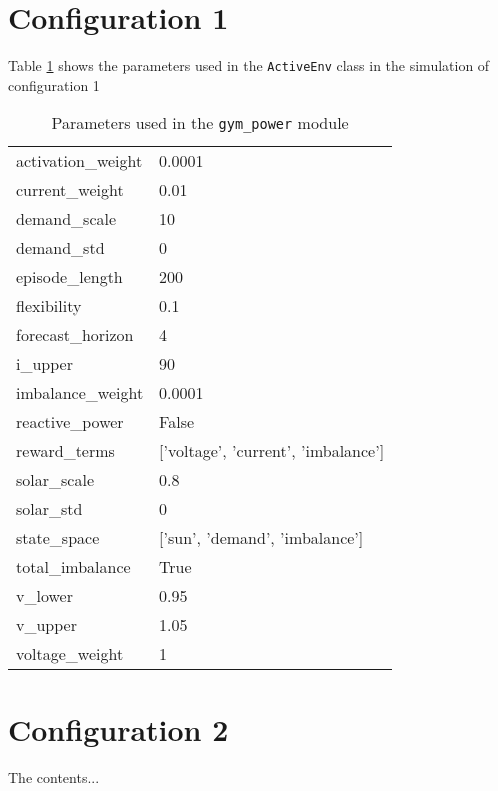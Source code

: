 \documentclass[class=book, crop=false]{standalone}
\begin{document}
\section{Configuration 1}
Table \ref{apendix:config1:params} shows the parameters used in the \texttt{ActiveEnv} class in the simulation of configuration 1

\begin{table}[ht]
\begin{tabular}{ll}
activation\_weight & 0.0001                                    \\
current\_weight    & 0.01                                      \\
demand\_scale      & 10                                        \\
demand\_std        & 0                                         \\
episode\_length    & 200                                       \\
flexibility        & 0.1                                       \\
forecast\_horizon  & 4                                         \\
i\_upper           & 90                                        \\
imbalance\_weight  & 0.0001                                    \\
reactive\_power    & False                                     \\
reward\_terms      & {[}'voltage',  'current',  'imbalance'{]} \\
solar\_scale       & 0.8                                       \\
solar\_std         & 0                                         \\
state\_space       & {[}'sun', 'demand',  'imbalance'{]}       \\
total\_imbalance   & True                                      \\
v\_lower           & 0.95                                      \\
v\_upper           & 1.05                                      \\
voltage\_weight    & 1                                        
\end{tabular}
\caption{Parameters used in the \texttt{gym\_power} module}
\label{apendix:config1:params}
\end{table}

\section{Configuration 2}
The contents...
\end{document}
